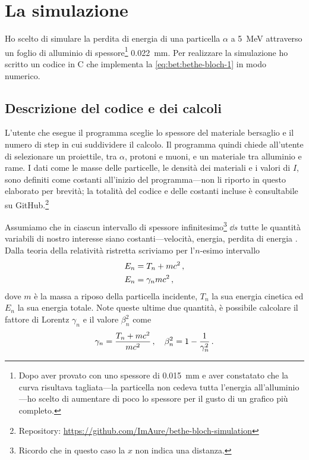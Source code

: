 \section{La simulazione}
    Ho scelto di simulare la perdita di energia di una particella $\alpha$ a \SI{5}{\mega\eV} attraverso un foglio di alluminio di spessore\footnote{Dopo aver provato con uno spessore di \SI{0.015}{\milli\meter} e aver constatato che la curva risultava tagliata---la particella non cedeva tutta l'energia all'alluminio---ho scelto di aumentare di poco lo spessore per il gusto di un grafico più completo.} \SI{0.022}{\milli\meter}. Per realizzare la simulazione ho scritto un codice in C che implementa la \eqref{eq:bet:bethe-bloch-1} in modo numerico.
    \subsection{Descrizione del codice e dei calcoli}
        L'utente che esegue il programma sceglie lo spessore del materiale bersaglio e il numero di step in cui suddividere il calcolo. Il programma quindi chiede all'utente di selezionare un proiettile, tra $\alpha$, protoni e muoni, e un materiale tra alluminio e rame. I dati come le masse delle particelle, le densità dei materiali e i valori di $I$, sono definiti come costanti all'inizio del programma---non li riporto in questo elaborato per brevità; la totalità del codice e delle costanti incluse è consultabile su GitHub.\footnote{Repository: \url{https://github.com/ImAure/bethe-bloch-simulation}}
        
        Assumiamo che in ciascun intervallo di spessore infinitesimo\footnote{Ricordo che in questo caso la $x$ non indica una distanza.} $\dd{s}$ tutte le quantità variabili di nostro interesse siano costanti---velocità, energia, perdita di energia \myetc. Dalla teoria della relatività ristretta scriviamo per l'$n$-esimo intervallo
        \begin{align*}   
                E_n &= T_n + m c^2 \,, \\
                E_n &= \gamma_n m c^2 \,,
        \end{align*}
        dove $m$ è la massa a riposo della particella incidente, $T_n$ la sua energia cinetica ed $E_n$ la sua energia totale. Note queste ultime due quantità, è possibile calcolare il fattore di Lorentz $\gamma_n$ e il valore $\beta_n^2$ come
        \begin{equation*}
            \gamma_n = \frac{T_n + m c^2}{m c^2}
            \,,
            \quad
            \beta_n^2 = 1 - \frac{1}{\gamma_n^2}
            \,.
        \end{equation*}

